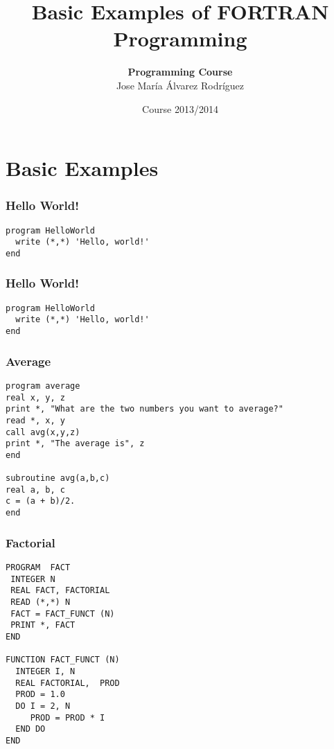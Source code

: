 \documentclass[xcolor=dvipsnames,dvip,notes=show,table]{beamer}
\title[FORTRAN]{Basic Examples of FORTRAN Programming}
\author[Jose María Álvarez Rodríguez]{\textbf{Programming Course} \\ \vspace{0.3cm} Jose María Álvarez Rodríguez}
\subtitle{}
\institute{Department of Computer Science \\ Carlos III University of Madrid}
\date{Course 2013/2014}
\begin{document}
\frame{
\titlepage

}
% 
% 
% 
% 
\section{Basic Examples}
% 
\frame{


}
\begin{frame}[fragile]
\frametitle{Hello World!}

\begin{lstlisting}
program HelloWorld
  write (*,*) 'Hello, world!' 
end
\end{lstlisting}
\end{frame}


\begin{frame}[fragile]
\frametitle{Hello World!}

\begin{lstlisting}
program HelloWorld
  write (*,*) 'Hello, world!' 
end
\end{lstlisting}
\end{frame}


\begin{frame}[fragile]
\frametitle{Average}

\scriptsize
\begin{lstlisting}
program average
real x, y, z
print *, "What are the two numbers you want to average?"
read *, x, y
call avg(x,y,z)
print *, "The average is", z
end
 
subroutine avg(a,b,c)
real a, b, c
c = (a + b)/2.
end
\end{lstlisting}
\end{frame}



\begin{frame}[fragile]
\frametitle{Factorial}

\scriptsize
\begin{lstlisting}
PROGRAM  FACT 
 INTEGER N 
 REAL FACT, FACTORIAL 
 READ (*,*) N 
 FACT = FACT_FUNCT (N) 
 PRINT *, FACT 
END

FUNCTION FACT_FUNCT (N) 
  INTEGER I, N 
  REAL FACTORIAL,  PROD 
  PROD = 1.0 
  DO I = 2, N 
     PROD = PROD * I 
  END DO 
END
\end{lstlisting}
\end{frame}
\end{document}
